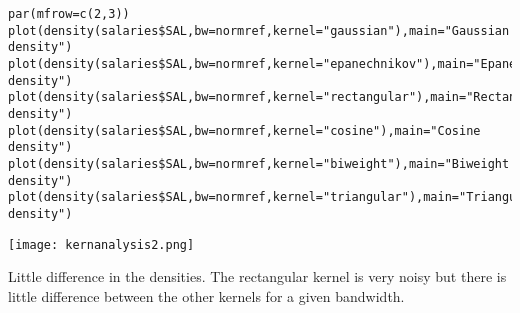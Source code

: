 \documentclass[11pt]{report}
\begin{document}
\begin{verbatim}
par(mfrow=c(2,3))
plot(density(salaries$SAL,bw=normref,kernel="gaussian"),main="Gaussian density")
plot(density(salaries$SAL,bw=normref,kernel="epanechnikov"),main="Epanechinkov density")
plot(density(salaries$SAL,bw=normref,kernel="rectangular"),main="Rectangular density")
plot(density(salaries$SAL,bw=normref,kernel="cosine"),main="Cosine density")
plot(density(salaries$SAL,bw=normref,kernel="biweight"),main="Biweight density")
plot(density(salaries$SAL,bw=normref,kernel="triangular"),main="Triangular density")
\end{verbatim}

\texttt{[image: kernanalysis2.png]}

Little difference in the densities. The rectangular kernel is very noisy but there is little difference between the other kernels for a given bandwidth.
\end{document}
